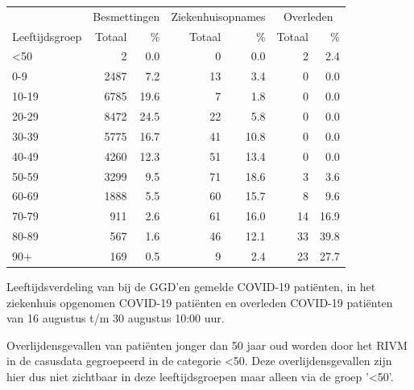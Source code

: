 \documentclass[
  english,
  man,floatsintext]{apa6}
\begin{document}
\begin{table}
\centering\begingroup\fontsize{11}{13}\selectfont

\begin{threeparttable}
\begin{tabular}{lrrrrrr}
\toprule
\multicolumn{1}{c}{ } & \multicolumn{2}{c}{Besmettingen} & \multicolumn{2}{c}{Ziekenhuisopnames} & \multicolumn{2}{c}{Overleden} \\
\cmidrule(l{3pt}r{3pt}){2-3} \cmidrule(l{3pt}r{3pt}){4-5} \cmidrule(l{3pt}r{3pt}){6-7}
Leeftijdsgroep & Totaal & \% & Totaal & \% & Totaal & \%\\
\midrule
<50 & 2 & 0.0 & 0 & 0.0 & 2 & 2.4\\
0-9 & 2487 & 7.2 & 13 & 3.4 & 0 & 0.0\\
10-19 & 6785 & 19.6 & 7 & 1.8 & 0 & 0.0\\
20-29 & 8472 & 24.5 & 22 & 5.8 & 0 & 0.0\\
30-39 & 5775 & 16.7 & 41 & 10.8 & 0 & 0.0\\
40-49 & 4260 & 12.3 & 51 & 13.4 & 0 & 0.0\\
50-59 & 3299 & 9.5 & 71 & 18.6 & 3 & 3.6\\
60-69 & 1888 & 5.5 & 60 & 15.7 & 8 & 9.6\\
70-79 & 911 & 2.6 & 61 & 16.0 & 14 & 16.9\\
80-89 & 567 & 1.6 & 46 & 12.1 & 33 & 39.8\\
90+ & 169 & 0.5 & 9 & 2.4 & 23 & 27.7\\
\bottomrule
\end{tabular}
\begin{tablenotes}
\item[1] Leeftijdsverdeling van bij de GGD’en gemelde COVID-19 patiënten, in het ziekenhuis opgenomen COVID-19 patiënten en overleden COVID-19 patiënten van 16 augustus t/m 30 augustus 10:00 uur.
\item[2] Overlijdensgevallen van patiënten jonger dan 50 jaar oud worden door het RIVM in de casusdata gegroepeerd in de categorie <50. Deze overlijdensgevallen zijn hier dus niet zichtbaar in deze leeftijdsgroepen maar alleen via de groep '<50'.
\end{tablenotes}
\end{threeparttable}
\endgroup{}
\end{table}

\newpage
\end{document}
